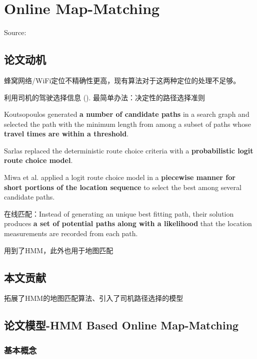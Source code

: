 \chapter{Online Map-Matching}

Source: \cite{Jagadeesh2017} 

\section{论文动机}
    蜂窝网络/WiFi定位不精确性更高，现有算法对于这两种定位的处理不足够。 
    
利用司机的驾驶选择信息 ().
最简单办法：决定性的路径选择准则

\begin{example}
    Koutsopoulos generated \textbf{a number of candidate paths} in a
search graph and selected the path with the minimum length
from among a subset of paths whose \textbf{travel times are within
a threshold}.

Sarlas replaced the deterministic route choice criteria with a
\textbf{probabilistic logit route choice model}.

Miwa et al. applied a logit route choice model in
a \textbf{piecewise manner for short portions of the location sequence}
to select the best among several candidate paths.
\end{example}

在线匹配：Instead of generating an unique best
fitting path, their solution produces \textbf{a set of potential paths
along with a likelihood} that the location measurements are
recorded from each path.

\cite{newson2009hidden} 用到了HMM，此外也用于地图匹配

\section{本文贡献}

拓展了HMM的地图匹配算法、引入了司机路径选择的模型

\section{论文模型-HMM Based Online Map-Matching}

\subsection{基本概念}

